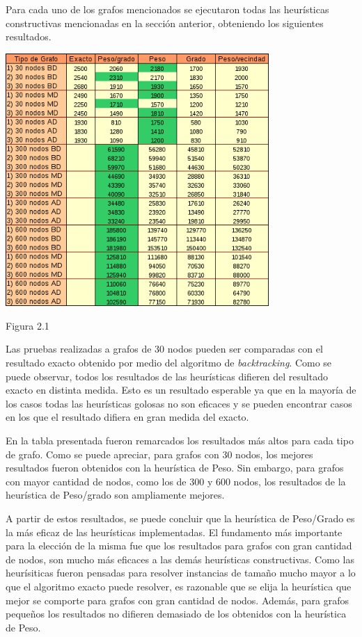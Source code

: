 \documentclass[a4paper,11pt] {article}
\begin{document}
Para cada uno de los grafos mencionados se ejecutaron todas las heur\'isticas constructivas mencionadas en la secci\'on anterior, obteniendo los siguientes resultados.

\begin{center}
 \includegraphics[width=0.75\textwidth]{tablas/tablaHC.png}
\begin{center}
Figura 2.1
\end{center}
\end{center}

Las pruebas realizadas a grafos de 30 nodos pueden ser comparadas con el resultado exacto obtenido por medio del algoritmo de \textit{backtracking}. Como se puede observar, todos los resultados de las heur\'isticas difieren del resultado exacto en distinta medida. Esto es un resultado esperable ya que en la mayor\'ia de los casos todas las heur\'isticas golosas no son eficaces y se pueden encontrar casos en los que el resultado difiera en gran medida del exacto.

En la tabla presentada fueron remarcados los resultados m\'as altos para cada tipo de grafo. Como se puede apreciar, para grafos con 30 nodos, los mejores resultados fueron obtenidos con la heur\'istica de Peso. Sin embargo, para grafos con mayor cantidad de nodos, como los de 300 y 600 nodos, los resultados de la heur\'istica de Peso/grado son ampliamente mejores.

A partir de estos resultados, se puede concluir que la heur\'istica de Peso/Grado es la m\'as eficaz de las heur\'isticas implementadas.  El fundamento m\'as importante para la elecci\'on de la misma fue que los resultados para grafos con gran cantidad de nodos, son mucho m\'as eficaces a las dem\'as heur\'isticas constructivas. Como las heur\'isiticas fueron pensadas para resolver instancias de tama\~{n}o mucho mayor a lo que el algoritmo exacto puede resolver, es razonable que se elija la heur\'istica que mejor se comporte para grafos con gran cantidad de nodos. Adem\'as, para grafos peque\~{n}os los resultados no difieren demasiado de los obtenidos con la heur\'istica de Peso.
\end{document}

